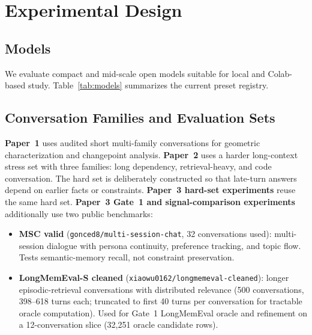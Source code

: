 \documentclass[conference]{IEEEtran}
\begin{document}
\section{Experimental Design}
\subsection{Models}
We evaluate compact and mid-scale open models suitable for local and Colab-based study. Table~\ref{tab:models} summarizes the current preset registry.

\begin{table}[t]
    \centering
    \caption{Current model registry used across the checkpoint.}
    \label{tab:models}
    \resizebox{\columnwidth}{!}{}
\end{table}

\subsection{Conversation Families and Evaluation Sets}
\textbf{Paper~1} uses audited short multi-family conversations for geometric characterization and changepoint analysis. \textbf{Paper~2} uses a harder long-context stress set with three families: long dependency, retrieval-heavy, and code conversation. The hard set is deliberately constructed so that late-turn answers depend on earlier facts or constraints. \textbf{Paper~3 hard-set experiments} reuse the same hard set. \textbf{Paper~3 Gate~1 and signal-comparison experiments} additionally use two public benchmarks:

\begin{itemize}[leftmargin=1.4em]
    \item \textbf{MSC valid} (\texttt{gonced8/multi-session-chat}, 32 conversations used): multi-session dialogue with persona continuity, preference tracking, and topic flow. Tests semantic-memory recall, not constraint preservation.
    \item \textbf{LongMemEval-S cleaned} (\texttt{xiaowu0162/longmemeval-cleaned}): longer episodic-retrieval conversations with distributed relevance (500 conversations, 398--618 turns each; truncated to first 40 turns per conversation for tractable oracle computation). Used for Gate~1 LongMemEval oracle and refinement on a 12-conversation slice (32{,}251 oracle candidate rows).
\end{itemize}
\end{document}
